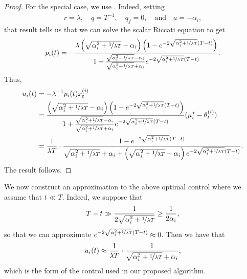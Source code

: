 \begin{proof}
    For the special case, we use .  Indeed, setting
    \begin{align}
        r = \lambda, \quad q = T^{-1}, \quad q_f = 0, \quad \text{and} \quad a = - \alpha_i,
    \end{align}
    that result tells us that we can solve the scalar Riccati equation to get
    \begin{align}
        p_i(t) = -\frac{\lambda \left( \sqrt{\alpha_i^2 + \nicefrac{1}{\lambda T}} - \alpha_i \right)\left( 1 - e^{- 2 \sqrt{\alpha_i^2 + \nicefrac{1}{\lambda T}} (T - t)} \right)}{1 + \frac{\sqrt{\alpha_i^2 + \nicefrac{1}{\lambda T}} - \alpha_i}{\sqrt{\alpha_i^2 + \nicefrac{1}{\lambda T}} + \alpha_i} e^{- 2 \sqrt{\alpha_i^2 + \nicefrac{1}{\lambda T}} (T - t)}}.
    \end{align}
    Thus,
    \begin{align}
        u_i(t) &= - \lambda^{-1} p_i(t) x_t^{(i)} \\
        &=\frac{ \left( \sqrt{\alpha_i^2 + \nicefrac{1}{\lambda T}} - \alpha_i \right)\left( 1 - e^{- 2 \sqrt{\alpha_i^2 + \nicefrac{1}{\lambda T}} (T - t)} \right)}{1 + \frac{\sqrt{\alpha_i^2 + \nicefrac{1}{\lambda T}} - \alpha_i}{\sqrt{\alpha_i^2 + \nicefrac{1}{\lambda T}} + \alpha_i} e^{- 2 \sqrt{\alpha_i^2 + \nicefrac{1}{\lambda T}} (T - t)}} (\mu^{\star}_i - \theta_t^{(i)}) \\
        &= \frac{1}{\lambda T} \cdot \frac{1 - e^{- 2 \sqrt{\alpha_i^2 + \nicefrac{1}{\lambda T}} (T - t)}}{\sqrt{\alpha_i^2 + \nicefrac{1}{\lambda T}} + \alpha_i + \left(\sqrt{\alpha_i^2 + \nicefrac{1}{\lambda T}} - \alpha_i\right)   e^{- 2 \sqrt{\alpha_i^2 + \nicefrac{1}{\lambda T}} (T - t)}}.
    \end{align}
    The result follows.
\end{proof}

We now construct an approximation to the above optimal control where we assume that $t \ll T$.  Indeed, we suppose that
\begin{align}
    T - t \gg \frac{1}{2 \sqrt{\alpha_i^2 + \nicefrac{1}{\lambda T}}} \geq \frac{1}{2 \alpha_i},
\end{align}
so that we can approximate $e^{- 2 \sqrt{\alpha_i^2 + \nicefrac{1}{\lambda T}} (T - t)} \approx 0$.  Then we have that
\begin{align}\label{eq:approx-optimal-control}
    u_i(t) \approx \frac{1}{\lambda T} \cdot \frac{1}{\sqrt{\alpha_i^2 + \nicefrac{1}{\lambda T}} + \alpha_i},
\end{align}
which is the form of the control used in our proposed algorithm.





